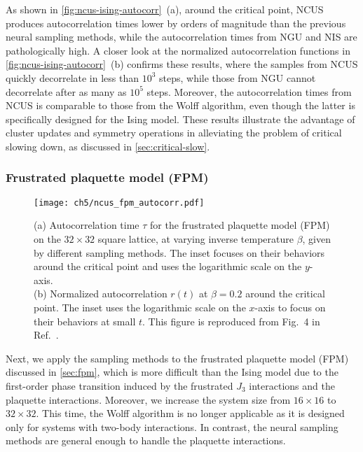 As shown in \cref{fig:ncus-ising-autocorr}~(a), around the critical point, NCUS produces autocorrelation times lower by orders of magnitude than the previous neural sampling methods, while the autocorrelation times from NGU and NIS are pathologically high. A closer look at the normalized autocorrelation functions in \cref{fig:ncus-ising-autocorr}~(b) confirms these results, where the samples from NCUS quickly decorrelate in less than $10^3$ steps, while those from NGU cannot decorrelate after as many as $10^5$ steps. Moreover, the autocorrelation times from NCUS is comparable to those from the Wolff algorithm, even though the latter is specifically designed for the Ising model. These results illustrate the advantage of cluster updates and symmetry operations in alleviating the problem of critical slowing down, as discussed in \cref{sec:critical-slow}.

\subsubsection{Frustrated plaquette model (FPM)}

\begin{figure}[htb]
\centering
\texttt{[image: ch5/ncus\_fpm\_autocorr.pdf]}
\caption[NCUS results of FPM]{
(a) Autocorrelation time $\tau$ for the frustrated plaquette model (FPM) on the $32 \times 32$ square lattice, at varying inverse temperature $\beta$, given by different sampling methods.
The inset focuses on their behaviors around the critical point and uses the logarithmic scale on the $y$-axis. \\
(b) Normalized autocorrelation $r(t)$ at $\beta = 0.2$ around the critical point.
The inset uses the logarithmic scale on the $x$-axis to focus on their behaviors at small $t$.
This figure is reproduced from Fig.~4 in Ref.~\cite{wu2021unbiased}.
}
\label{fig:ncus-fpm-autocorr}
\end{figure}

Next, we apply the sampling methods to the frustrated plaquette model (FPM) discussed in \cref{sec:fpm}, which is more difficult than the Ising model due to the first-order phase transition induced by the frustrated $J_3$ interactions and the plaquette interactions. Moreover, we increase the system size from $16 \times 16$ to $32 \times 32$. This time, the Wolff algorithm is no longer applicable as it is designed only for systems with two-body interactions. In contrast, the neural sampling methods are general enough to handle the plaquette interactions.

